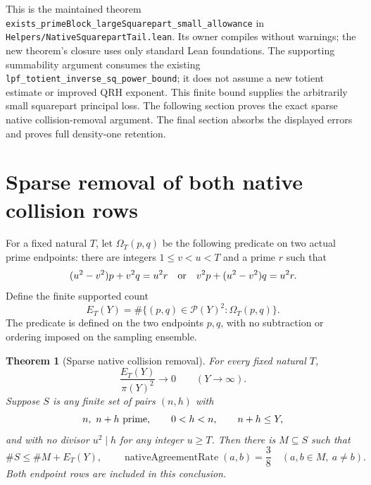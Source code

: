 \documentclass[11pt]{article}
\newtheorem{theorem}{Theorem}[section]
\begin{document}
This is the maintained theorem
\texttt{exists\_primeBlock\_largeSquarepart\_small\_allowance}
in \texttt{Helpers/\allowbreak NativeSquarepartTail.\allowbreak lean}.
Its owner compiles without warnings; the new theorem's closure
uses only standard Lean foundations.
The supporting summability argument consumes the existing
\texttt{lpf\_totient\_inverse\_sq\_power\_bound};
it does not assume a new totient estimate or improved QRH exponent.
This finite bound supplies the arbitrarily small squarepart
principal loss. The following section proves the exact sparse native
collision-removal argument. The final section absorbs the displayed
errors and proves full density-one retention.

\section{Sparse removal of both native collision rows}
\label{sec:native-sparse-collisions}

For a fixed natural \(T\), let \(\Omega_T(p,q)\) be the following
predicate on two actual prime endpoints:
there are integers \(1\le v<u<T\) and a prime \(r\) such that
\[
 (u^2-v^2)p+v^2q=u^2r
 \quad\hbox{or}\quad
 v^2p+(u^2-v^2)q=u^2r.
\]
Define the finite supported count
\[
 E_T(Y)=\#\{(p,q)\in\mathcal P(Y)^2:\Omega_T(p,q)\}.
\]
The predicate is defined on the two endpoints \(p,q\), with no
subtraction or ordering imposed on the sampling ensemble.

\begin{theorem}[Sparse native collision removal]
\label{thm:native-sparse-collision-removal}
For every fixed natural \(T\),
\[
 \frac{E_T(Y)}{\pi(Y)^2}\longrightarrow0
 \qquad(Y\longrightarrow\infty).
\]
Suppose \(S\) is any finite set of pairs \((n,h)\) with
\[
 n,\ n+h\ \hbox{prime},\qquad 0<h<n,\qquad n+h\le Y,
\]
and with no divisor \(u^2\mid h\) for any integer \(u\ge T\).
Then there is \(M\subseteq S\) such that
\[
 \#S\le\#M+E_T(Y),
 \qquad
 \operatorname{nativeAgreementRate}(a,b)=\frac38
 \quad(a,b\in M,\ a\ne b).
\]
Both endpoint rows are included in this conclusion.
\end{theorem}
\end{document}
